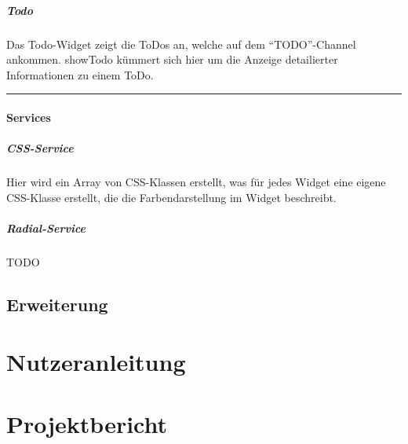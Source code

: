 \documentclass[10pt,a4paper]{report}
\newcommand{\code}[1]{{\fontfamily{cmvtt}\selectfont #1}}
\newcommand{\HRule}{\rule{\linewidth}{0.1pt}} %
\begin{document}
				\paragraph{Todo}
					Das Todo-Widget zeigt die ToDos an, welche auf dem "`TODO"'-Channel ankommen. \code{showTodo} kümmert sich hier um die Anzeige detailierter Informationen zu einem ToDo.\\
				\HRule
			\subsubsection{Services}
				\paragraph{CSS-Service}
					Hier wird ein Array von CSS-Klassen erstellt, was für jedes Widget eine eigene CSS-Klasse erstellt, die die Farbendarstellung im Widget beschreibt.
				\paragraph{Radial-Service}
					TODO  

	
	\section{Erweiterung}

\chapter{Nutzeranleitung}

\chapter{Projektbericht}
\end{document}
